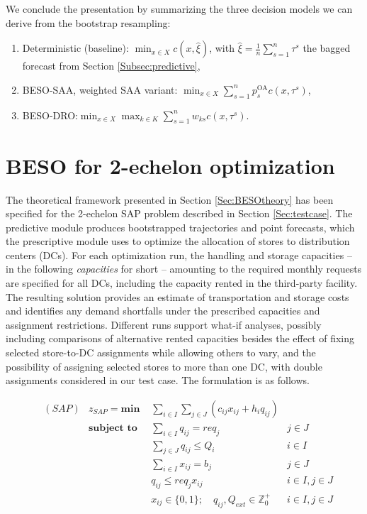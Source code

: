 \documentclass[mnsc,sglanonrev]{informs4}  %
\theoremstyle{remark}\newtheorem{remark}{Remark}
\begin{document}
We conclude the presentation by summarizing the three decision models we can derive from the bootstrap resampling:
\begin{enumerate}
  \item Deterministic (baseline): \(\displaystyle \min_{x\in X}c(x,\widehat\xi)\), with \( \widehat\xi=\frac1n\sum_{s=1}^{n}\tau^s\) the bagged forecast from Section \ref{Subsec:predictive},
  \item BESO-SAA, weighted SAA variant: \(\displaystyle \min_{x\in X}\sum_{s=1}^{n}p_s^{\mathrm{OA}}c(x,\tau^s)\),
  \item BESO-DRO:\(\displaystyle \min_{x\in X}\max_{k\in K}\sum_{s=1}^{n}w_{ks}c(x,\tau^s)\).
\end{enumerate}

\section{BESO for 2-echelon optimization} \label{Sec:BESO2ech}

The theoretical framework presented in Section \ref{Sec:BESOtheory} has been specified for the 2-echelon SAP problem described in Section \ref{Sec:testcase}.
The predictive module produces bootstrapped trajectories and point forecasts, which the prescriptive module uses to optimize the allocation of stores to distribution centers (DCs). For each optimization run, the handling and storage capacities -- in the following \textit{capacities} for short -- amounting to the required monthly requests are specified for all DCs, including the capacity rented in the third-party facility. The resulting solution provides an estimate of transportation and storage costs and identifies any demand shortfalls under the prescribed capacities and assignment restrictions. Different runs support what-if analyses, possibly including comparisons of alternative rented capacities besides the effect of fixing selected store-to-DC assignments while allowing others to vary, and the possibility of assigning selected stores to more than one DC, with double assignments considered in our test case. The formulation is as follows.

\begin{align}
	&(SAP) & z_{SAP} = \textbf{min } & \sum_{i \in I} \sum_{j \in J} ( c_{ij}x_{ij} + h_i q_{ij} ) \label{ALLobj}\\
	& &  \textbf{subject to }
	& \sum_{i \in I} q_{ij} = req_j & j \in J  \label{ALLrequest}\\
	& &  & \sum_{j \in J}q_{ij} \leq Q_i & i \in I \label{ALLcapacity}\\
	& &  & \sum_{i \in I} x_{ij} = b_j & j \in J  \label{ALLnumserv}\\
	& &  & q_{ij} \leq req_j x_{ij} & i \in I, j \in J  \label{ALLquant}\\
    & &  & x_{ij} \in \{0,1\};\quad q_{ij},Q_{ext} \in \mathbb{Z}^+_0 & i \in I, j \in J \label{ALLcontin}
\end{align}
\end{document}

